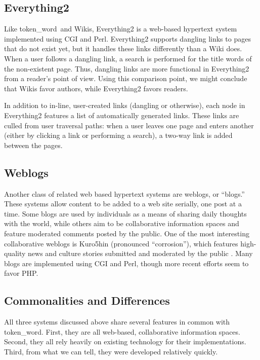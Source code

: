 \documentclass{acm_proc_article-sp}
\newcommand{\tokenWord}{token\_word}
\begin{document}
\subsection{Everything2}
Like \tokenWord \  and Wikis, Everything2 \cite{Everything2} is a web-based hypertext system implemented using CGI and Perl.
Everything2 supports dangling links to pages that do not exist yet, but it handles these links differently than a Wiki does.
When a user follows a dangling link, a search is performed for the title words of the non-existent page.
Thus, dangling links are more functional in Everything2 from a reader's point of view.
Using this comparison point, we might conclude that Wikis favor authors, while Everything2 favors readers.

In addition to in-line, user-created links (dangling or otherwise), each node in Everything2 features a list of automatically generated links.
These links are culled from user traversal paths:  when a user leaves one page and enters another (either by clicking a link or performing a search), a two-way link is added between the pages.   


\subsection{Weblogs}
Another class of related web based hypertext systems are weblogs, or ``blogs.''
These systems allow content to be added to a web site serially, one post at a time.
Some blogs are used by individuals as a means of sharing daily thoughts with the world, while others aim to be collaborative information spaces and feature moderated comments posted by the public.
One of the most interesting collaborative weblogs is Kuro5hin (pronounced ``corrosion''), which features high-quality news and culture stories submitted and moderated by the public \cite{kuro5hin}.
Many blogs are implemented using CGI and Perl, though more recent efforts seem to favor PHP.


\subsection{Commonalities and Differences}
All three systems discussed above share several features in common with \tokenWord.
First, they are all web-based, collaborative information spaces.
Second, they all rely heavily on existing technology for their implementations.
Third, from what we can tell, they were developed relatively quickly.
\end{document}
